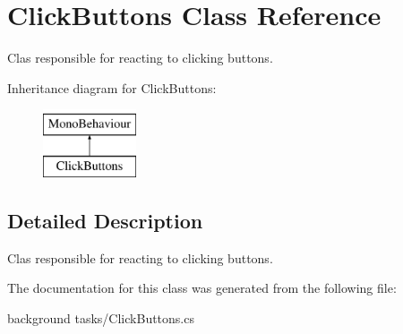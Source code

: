 \hypertarget{class_click_buttons}{}\section{Click\+Buttons Class Reference}
\label{class_click_buttons}


Clas responsible for reacting to clicking buttons.  


Inheritance diagram for Click\+Buttons\+:\begin{figure}[H]
\begin{center}
\leavevmode
\includegraphics[height=2.000000cm]{class_click_buttons}
\end{center}
\end{figure}


\subsection{Detailed Description}
Clas responsible for reacting to clicking buttons. 



The documentation for this class was generated from the following file\+:\begin{DoxyCompactItemize}
\item 
background tasks/Click\+Buttons.\+cs\end{DoxyCompactItemize}
